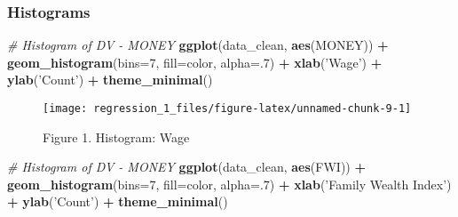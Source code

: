\documentclass[]{article}
\newenvironment{Shaded}{\begin{snugshade}}{\end{snugshade}}
\newcommand{\CommentTok}[1]{\textcolor[rgb]{0.56,0.35,0.01}{\textit{#1}}}
\newcommand{\DataTypeTok}[1]{\textcolor[rgb]{0.13,0.29,0.53}{#1}}
\newcommand{\DecValTok}[1]{\textcolor[rgb]{0.00,0.00,0.81}{#1}}
\newcommand{\KeywordTok}[1]{\textcolor[rgb]{0.13,0.29,0.53}{\textbf{#1}}}
\newcommand{\NormalTok}[1]{#1}
\newcommand{\OperatorTok}[1]{\textcolor[rgb]{0.81,0.36,0.00}{\textbf{#1}}}
\newcommand{\StringTok}[1]{\textcolor[rgb]{0.31,0.60,0.02}{#1}}
\begin{document}
\hypertarget{histograms}{%
\subsubsection{Histograms}\label{histograms}}

\begin{Shaded}
\begin{Highlighting}[]
\CommentTok{# Histogram of DV - MONEY}
\KeywordTok{ggplot}\NormalTok{(data_clean, }\KeywordTok{aes}\NormalTok{(MONEY)) }\OperatorTok{+}\StringTok{ }\KeywordTok{geom_histogram}\NormalTok{(}\DataTypeTok{bins=}\DecValTok{7}\NormalTok{, }\DataTypeTok{fill=}\NormalTok{color, }\DataTypeTok{alpha=}\NormalTok{.}\DecValTok{7}\NormalTok{) }\OperatorTok{+}\StringTok{ }
\StringTok{                           }\KeywordTok{xlab}\NormalTok{(}\StringTok{'Wage'}\NormalTok{) }\OperatorTok{+}\StringTok{ }
\StringTok{                           }\KeywordTok{ylab}\NormalTok{(}\StringTok{'Count'}\NormalTok{) }\OperatorTok{+}\StringTok{ }
\StringTok{                           }\KeywordTok{theme_minimal}\NormalTok{()}
\end{Highlighting}
\end{Shaded}

\begin{figure}

{\centering \texttt{[image: regression\_1\_files/figure-latex/unnamed-chunk-9-1]} 

}

\caption{Figure 1. Histogram: Wage}\label{fig:unnamed-chunk-9}
\end{figure}

\begin{Shaded}
\begin{Highlighting}[]
\CommentTok{# Histogram of DV - MONEY}
\KeywordTok{ggplot}\NormalTok{(data_clean, }\KeywordTok{aes}\NormalTok{(FWI)) }\OperatorTok{+}\StringTok{ }\KeywordTok{geom_histogram}\NormalTok{(}\DataTypeTok{bins=}\DecValTok{7}\NormalTok{, }\DataTypeTok{fill=}\NormalTok{color, }\DataTypeTok{alpha=}\NormalTok{.}\DecValTok{7}\NormalTok{) }\OperatorTok{+}\StringTok{ }
\StringTok{                           }\KeywordTok{xlab}\NormalTok{(}\StringTok{'Family Wealth Index'}\NormalTok{) }\OperatorTok{+}\StringTok{ }
\StringTok{                           }\KeywordTok{ylab}\NormalTok{(}\StringTok{'Count'}\NormalTok{) }\OperatorTok{+}\StringTok{ }
\StringTok{                           }\KeywordTok{theme_minimal}\NormalTok{()}
\end{Highlighting}
\end{Shaded}
\end{document}
